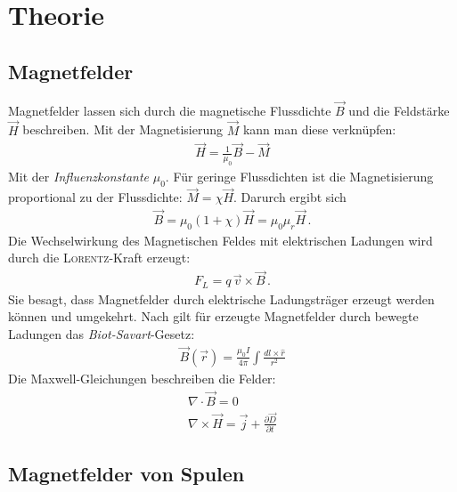 \documentclass[12pt,a4paper,titlepage,headinclude,bibtotoc]{scrartcl}
\begin{document}
\section{Theorie}
\label{sec:theorie}
\subsection{Magnetfelder}
Magnetfelder lassen sich durch die magnetische Flussdichte $\vec B$ und die Feldstärke $\vec H$ beschreiben.
Mit der Magnetisierung $\vec M$ kann man diese verknüpfen:
\begin{align}
	\vec H=\frac 1{\mu_0}\vec B-\vec M
\end{align}
Mit der \emph{Influenzkonstante} $\mu_0$.
Für geringe Flussdichten ist die Magnetisierung proportional zu der Flussdichte: $\vec M=\chi\vec H$.
Darurch ergibt sich
\begin{align}
	\vec B=\mu_0(1+\chi )\vec H=\mu_0\mu_r\vec H\, .
\end{align}
Die Wechselwirkung des Magnetischen Feldes mit elektrischen Ladungen wird durch die \textsc{Lorentz}-Kraft erzeugt:
\begin{align}
	F_L=q\,\vec v\times \vec B\,.\label{eq:Lorentz}
\end{align}
Sie besagt, dass Magnetfelder durch elektrische Ladungsträger erzeugt werden können und umgekehrt.
Nach \cite[S.215]{griffith} gilt für erzeugte Magnetfelder durch bewegte Ladungen das \emph{Biot-Savart}-Gesetz:
\begin{align}
	\vec B(\vec r)=\frac{\mu_0 I}{4\pi}\int\frac{dl\times \hat r}{r^2}\label{eq:Biot}
\end{align}
Die Maxwell-Gleichungen beschreiben die Felder:
\begin{align}
	\nabla\cdot\vec B=0\\
	\nabla\times\vec H=\vec j+\frac{\partial \vec D}{\partial t}
\end{align}

\subsection{Magnetfelder von Spulen}
\end{document}
